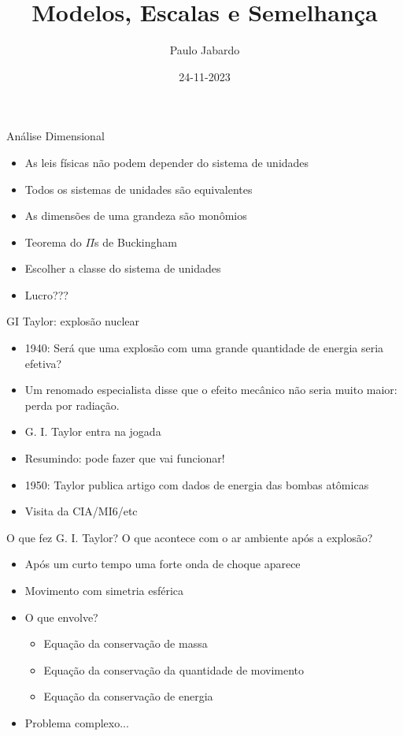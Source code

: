 \documentclass{beamer}
\title{Modelos, Escalas e Semelhança}
\author{Paulo Jabardo}
\date{24-11-2023}
\begin{document}
\maketitle
\begin{frame}{Análise Dimensional}
  
  \begin{itemize}
  \item As leis físicas não podem depender do sistema de unidades
  \item Todos os sistemas de unidades são equivalentes
  \item As dimensões de uma grandeza são monômios
  \item Teorema do $\Pi$s de Buckingham
  \item Escolher a classe do sistema de unidades
  \item Lucro???
  \end{itemize}
\end{frame}

\begin{frame}{GI Taylor: explosão nuclear}
  
  \begin{itemize}
  \item 1940: Será que uma explosão com uma grande quantidade de energia seria efetiva?
  \item Um renomado especialista disse que o efeito mecânico não seria muito maior: perda por radiação.
  \item G. I. Taylor entra na jogada
  \item Resumindo: pode fazer que vai funcionar!
  \item 1950: Taylor publica artigo com dados de energia das bombas atômicas
  \item Visita da CIA/MI6/etc
\end{itemize}
  
\end{frame}

\begin{frame}{O que fez G. I. Taylor?}
  O que acontece com o ar ambiente após a explosão?
  \begin{itemize}
  \item Após um curto tempo uma forte onda de choque aparece
  \item Movimento com simetria esférica
  \item O que envolve?
    \begin{itemize}
    \item Equação da conservação de massa
    \item Equação da conservação da quantidade de movimento
    \item Equação da conservação de energia
    \end{itemize}
  \item Problema complexo...
  \end{itemize}

 
\end{frame}
\end{document}
